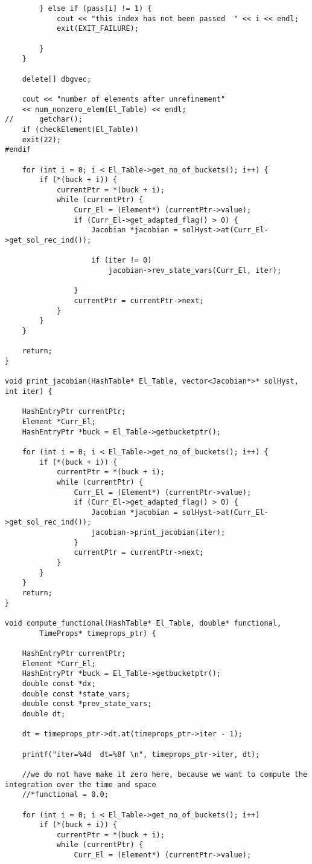 \documentclass[a4paper,10pt]{article}
\begin{document}
\begin{lstlisting}
		} else if (pass[i] != 1) {
			cout << "this index has not been passed  " << i << endl;
			exit(EXIT_FAILURE);

		}
	}

	delete[] dbgvec;

	cout << "number of elements after unrefinement"
	<< num_nonzero_elem(El_Table) << endl;
//		getchar();
	if (checkElement(El_Table))
	exit(22);
#endif

	for (int i = 0; i < El_Table->get_no_of_buckets(); i++) {
		if (*(buck + i)) {
			currentPtr = *(buck + i);
			while (currentPtr) {
				Curr_El = (Element*) (currentPtr->value);
				if (Curr_El->get_adapted_flag() > 0) {
					Jacobian *jacobian = solHyst->at(Curr_El->get_sol_rec_ind());

					if (iter != 0)
						jacobian->rev_state_vars(Curr_El, iter);

				}
				currentPtr = currentPtr->next;
			}
		}
	}

	return;
}

void print_jacobian(HashTable* El_Table, vector<Jacobian*>* solHyst, int iter) {

	HashEntryPtr currentPtr;
	Element *Curr_El;
	HashEntryPtr *buck = El_Table->getbucketptr();

	for (int i = 0; i < El_Table->get_no_of_buckets(); i++) {
		if (*(buck + i)) {
			currentPtr = *(buck + i);
			while (currentPtr) {
				Curr_El = (Element*) (currentPtr->value);
				if (Curr_El->get_adapted_flag() > 0) {
					Jacobian *jacobian = solHyst->at(Curr_El->get_sol_rec_ind());
					jacobian->print_jacobian(iter);
				}
				currentPtr = currentPtr->next;
			}
		}
	}
	return;
}

void compute_functional(HashTable* El_Table, double* functional,
		TimeProps* timeprops_ptr) {

	HashEntryPtr currentPtr;
	Element *Curr_El;
	HashEntryPtr *buck = El_Table->getbucketptr();
	double const *dx;
	double const *state_vars;
	double const *prev_state_vars;
	double dt;

	dt = timeprops_ptr->dt.at(timeprops_ptr->iter - 1);

	printf("iter=%4d  dt=%8f \n", timeprops_ptr->iter, dt);

	//we do not have make it zero here, because we want to compute the integration over the time and space
	//*functional = 0.0;

	for (int i = 0; i < El_Table->get_no_of_buckets(); i++)
		if (*(buck + i)) {
			currentPtr = *(buck + i);
			while (currentPtr) {
				Curr_El = (Element*) (currentPtr->value);


\end{lstlisting}
\end{document}
